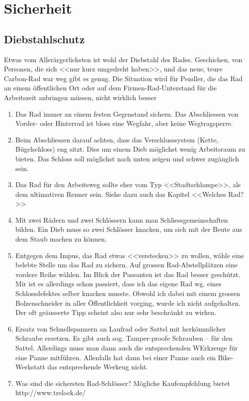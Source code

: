 \chapter{Sicherheit}

\section{Diebstahlschutz}

Etwas vom Allerärgerlichsten ist wohl der Diebstahl des Rades. Geschichen,
von Personen, die sich <<nur kurz umgedreht haben>>, und das neue, teure
Carbon-Rad war weg gibt es genug. Die Situation wird für Pendler, die das
Rad an einem öffentlichen Ort oder auf dem Firmen-Rad-Unterstand für die
Arbeitszeit anbringen müssen, nicht wirklich besser

\begin{enumerate}
  \item Das Rad immer an einem festen Gegenstand sichern. Das Abschliessen von Vorder- oder Hinterrad ist bloss eine 
    Wegfahr, aber keine Wegtragsperre.

  \item Beim Abschliessen darauf achten, dass das Verschlusssystem (Kette, Bügelschloss) eng sitzt.
    Dies um einem Dieb möglichst wenig Arbeitsraum zu bieten. Das Schloss soll möglichst nach unten zeigen und
    schwer zugänglich sein.

  \item Das Rad für den Arbeitsweg sollte eher vom Typ <<Stadtschlampe>>, als dem ultimativen Renner sein.
    Siehe dazu auch das Kapitel <<Welches Rad?>>

  \item Mit zwei Rädern und zwei Schlössern kann man Schliessgemeinschaften bilden.
    Ein Dieb muss so zwei Schlösser knacken, um sich mit der Beute aus dem Staub machen zu können.

  \item Entgegen dem Impus, das Rad etwas <<verstecken>> zu wollen, wähle eine belebte Stelle um das Rad zu sichern.
    Auf grossen Rad-Abstellplätzen eine vordere Reihe wählen.
    Im Blick der Passanten ist das Rad besser geschützt.
    Mir ist es allerdings schon passiert, dass ich das eigene Rad wg. eines Schlossdefektes selber knacken musste.
    Obwohl ich dabei mit einem grossen Bolzenschneider in aller Öffentlichkeit vorging, wurde ich nicht aufgehalten.
    Der oft geäusserte Tipp scheint also nur sehr beschränkt zu wirken.

  \item Ersatz von Schnellspannern an Laufrad oder Sattel mit herkömmlicher Schraube ersetzen.
    Es gibt auch sog. Tamper-proofe Schrauben -- für den Sattel. Allerdings muss man dann auch die entsprechenden WErkzeuge
    für eine Panne mitführen. Allenfalls hat dann bei einer Panne auch ein Bike-Werkstatt das entsprechende Werkeug nicht.

  \item Was sind die sichersten Rad-Schlösser? Mögliche Kaufempfehlung bietet http://www.trelock.de/

\end{enumerate}


